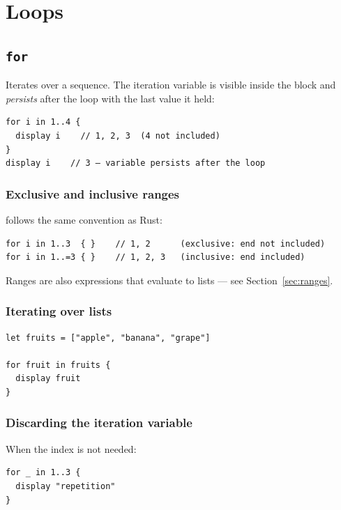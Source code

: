 \chapter{Loops}

\section{\texttt{for}}

Iterates over a sequence. The iteration variable is visible inside the
block and \textit{persists} after the loop with the last value it held:

\begin{lstlisting}[caption={for over a range}]
for i in 1..4 {
  display i    // 1, 2, 3  (4 not included)
}
display i    // 3 — variable persists after the loop
\end{lstlisting}

\subsection*{Exclusive and inclusive ranges}

\hayashi{} follows the same convention as Rust:

\begin{lstlisting}
for i in 1..3  { }    // 1, 2      (exclusive: end not included)
for i in 1..=3 { }    // 1, 2, 3   (inclusive: end included)
\end{lstlisting}

Ranges are also expressions that evaluate to lists — see
Section~\ref{sec:ranges}.

\subsection*{Iterating over lists}

\begin{lstlisting}
let fruits = ["apple", "banana", "grape"]

for fruit in fruits {
  display fruit
}
\end{lstlisting}

\subsection*{Discarding the iteration variable}

When the index is not needed:

\begin{lstlisting}
for _ in 1..3 {
  display "repetition"
}
\end{lstlisting}

